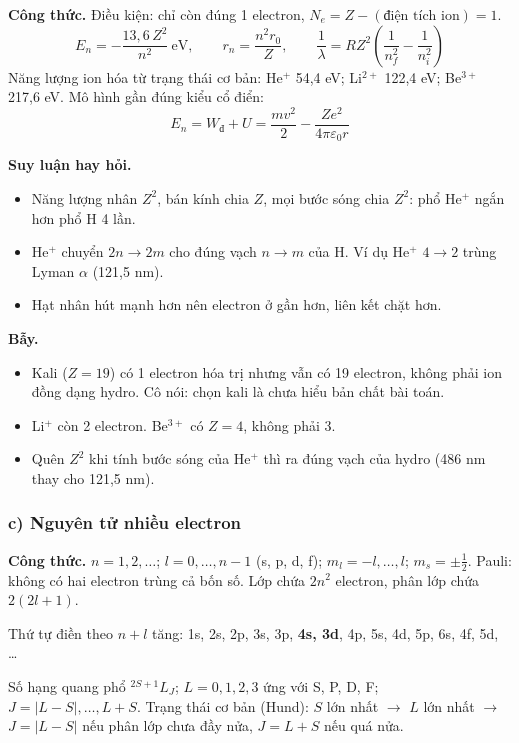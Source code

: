 \documentclass[11pt,a4paper]{article}
\newcommand{\Wd}{W_{\text{đ}}}
\begin{document}
\textbf{Công thức.}
Điều kiện: chỉ còn đúng 1 electron, $N_e=Z-(\text{điện tích ion})=1$.
\begin{equation*}
    E_n=-\frac{13{,}6\,Z^2}{n^2}\ \text{eV},\qquad r_n=\frac{n^2r_0}{Z},\qquad \frac1\lambda=RZ^2\left(\frac1{n_f^2}-\frac1{n_i^2}\right)
\end{equation*}
Năng lượng ion hóa từ trạng thái cơ bản: He$^{+}$ 54,4 eV; Li$^{2+}$ 122,4 eV; Be$^{3+}$ 217,6 eV. Mô hình gần đúng kiểu cổ điển:
\begin{equation*}
    E_n=\Wd+U=\frac{mv^2}{2}-\frac{Ze^2}{4\pi\varepsilon_0r}
\end{equation*}

\textbf{Suy luận hay hỏi.}
\begin{itemize}
    \item Năng lượng nhân $Z^2$, bán kính chia $Z$, mọi bước sóng chia $Z^2$: phổ He$^{+}$ ngắn hơn phổ H 4 lần.
    \item He$^{+}$ chuyển $2n\to2m$ cho đúng vạch $n\to m$ của H. Ví dụ He$^{+}$ $4\to2$ trùng Lyman $\alpha$ (121,5 nm).
    \item Hạt nhân hút mạnh hơn nên electron ở gần hơn, liên kết chặt hơn.
\end{itemize}

\textbf{Bẫy.}
\begin{itemize}
    \item Kali ($Z=19$) có 1 electron hóa trị nhưng vẫn có 19 electron, không phải ion đồng dạng hydro. Cô nói: chọn kali là chưa hiểu bản chất bài toán.
    \item Li$^{+}$ còn 2 electron. Be$^{3+}$ có $Z=4$, không phải 3.
    \item Quên $Z^2$ khi tính bước sóng của He$^{+}$ thì ra đúng vạch của hydro (486 nm thay cho 121,5 nm).
\end{itemize}

\subsubsection*{c) Nguyên tử nhiều electron}

\textbf{Công thức.}
$n=1,2,\dots$; $l=0,\dots,n-1$ (s, p, d, f); $m_l=-l,\dots,l$; $m_s=\pm\frac12$. Pauli: không có hai electron trùng cả bốn số. Lớp chứa $2n^2$ electron, phân lớp chứa $2(2l+1)$.

Thứ tự điền theo $n+l$ tăng: 1s, 2s, 2p, 3s, 3p, \textbf{4s, 3d}, 4p, 5s, 4d, 5p, 6s, 4f, 5d, \dots

Số hạng quang phổ ${}^{2S+1}L_J$; $L=0,1,2,3$ ứng với S, P, D, F; $J=|L-S|,\dots,L+S$. Trạng thái cơ bản (Hund): $S$ lớn nhất $\to$ $L$ lớn nhất $\to$ $J=|L-S|$ nếu phân lớp chưa đầy nửa, $J=L+S$ nếu quá nửa.
\end{document}
